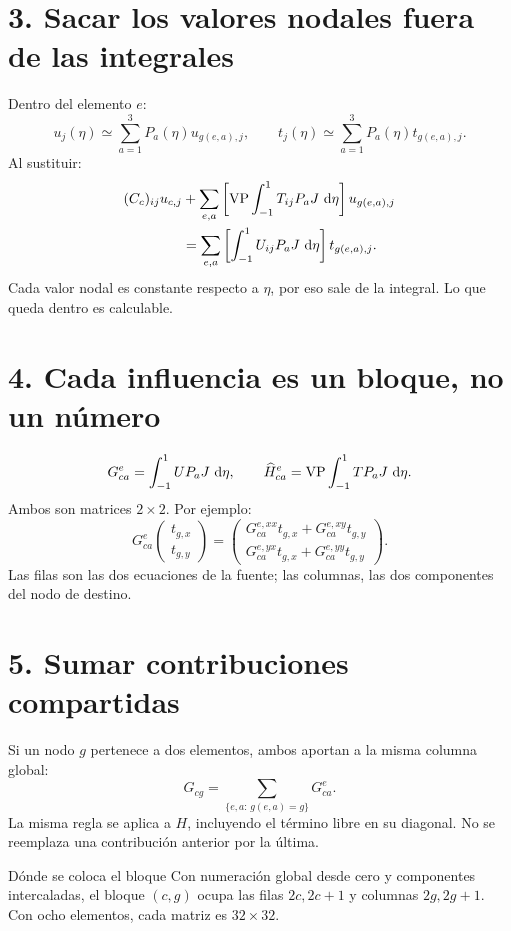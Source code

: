 \documentclass[11pt]{article}
\begin{document}
\newpage
\section*{3. Sacar los valores nodales fuera de las integrales}
Dentro del elemento \(e\):
\[
 u_j(\eta)\simeq\sum_{a=1}^3P_a(\eta)u_{g(e,a),j},\qquad
 t_j(\eta)\simeq\sum_{a=1}^3P_a(\eta)t_{g(e,a),j}.
\]
Al sustituir:
\[
\begin{aligned}
 (C_c)_{ij}u_{c,j}
 &+\sum_{e,a}\left[\operatorname{VP}\int_{-1}^{1}
 T_{ij}P_aJ\,\,\mathrm{d}\eta\right]u_{g(e,a),j}\\
 &=\sum_{e,a}\left[\int_{-1}^{1}
 U_{ij}P_aJ\,\,\mathrm{d}\eta\right]t_{g(e,a),j}.
\end{aligned}
\]
Cada valor nodal es constante respecto a \(\eta\), por eso sale de la
integral. Lo que queda dentro es calculable.

\section*{4. Cada influencia es un bloque, no un número}
\[
 G^e_{ca}=\int_{-1}^{1}UP_aJ\,\,\mathrm{d}\eta,\qquad
 \widehat H^e_{ca}=\operatorname{VP}\int_{-1}^{1}TP_aJ\,\,\mathrm{d}\eta.
\]
Ambos son matrices \(2\times2\). Por ejemplo:
\[
 G^e_{ca}
 \begin{pmatrix}t_{g,x}\\t_{g,y}\end{pmatrix}
 =
 \begin{pmatrix}
 G^{e,xx}_{ca}t_{g,x}+G^{e,xy}_{ca}t_{g,y}\\
 G^{e,yx}_{ca}t_{g,x}+G^{e,yy}_{ca}t_{g,y}
 \end{pmatrix}.
\]
Las filas son las dos ecuaciones de la fuente; las columnas, las dos
componentes del nodo de destino.

\section*{5. Sumar contribuciones compartidas}
Si un nodo \(g\) pertenece a dos elementos, ambos aportan a la misma columna
global:
\[
 G_{cg}=\sum_{\{e,a:\,g(e,a)=g\}}G^e_{ca}.
\]
La misma regla se aplica a \(H\), incluyendo el término libre en su diagonal.
No se reemplaza una contribución anterior por la última.

\begin{resultado}{Dónde se coloca el bloque}
Con numeración global desde cero y componentes intercaladas, el bloque
\((c,g)\) ocupa las filas \(2c,2c+1\) y columnas \(2g,2g+1\).
Con ocho elementos, cada matriz es \(32\times32\).
\end{resultado}
\end{document}
